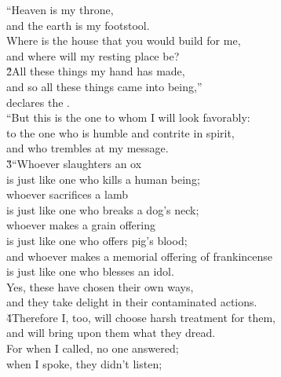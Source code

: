 \begin{poetry}
\poeml ``Heaven is my throne, \\
\poemll    and the earth is my footstool. \\
\poeml Where is the house that you would build for me, \\
\poemll    and where will my resting place be? \\
\poeml \v{2}All these things my hand has made, \\
\poemll    and so all these things came into being,'' \\
\poemlll       declares the . \\
\poeml ``But this is the one to whom I will look favorably: \\
\poemll    to the one who is humble and contrite in spirit, \\
\poemlll       and who trembles at my message. \\
\poeml \v{3}``Whoever slaughters an ox \\
\poemll    is just like one who kills a human being; \\
\poeml whoever sacrifices a lamb \\
\poemll    is just like one who breaks a dog's neck; \\
\poeml whoever makes a grain offering \\
\poemll    is just like one who offers pig's blood; \\
\poeml and whoever makes a memorial offering of frankincense \\
\poemll    is just like one who blesses an idol. \\
\poeml Yes, these have chosen their own ways, \\
\poemll    and they take delight in their contaminated actions. \\
\poeml \v{4}Therefore I, too, will choose harsh treatment for them, \\
\poemll    and will bring upon them what they dread. \\
\poeml For when I called, no one answered; \\
\poemll    when I spoke, they didn't listen; \\

\end{poetry}
